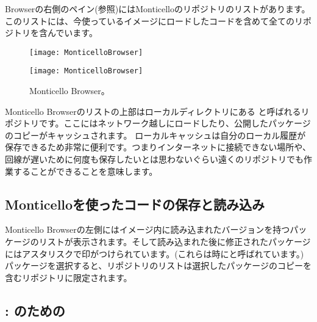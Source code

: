 \documentclass[a4paper,10pt,twoside]{book}
\begin{document}
Browserの右側のペイン(参照)にはMonticelloのリポジトリのリストがあります。このリストには、今使っているイメージにロードしたコードを含めて全てのリポジトリを含んでいます。


\begin{figure}[hbt]
\ifluluelse
	{\centerline {\texttt{[image: MonticelloBrowser]}}}
	{\centerline {\texttt{[image: MonticelloBrowser]}}}
\caption{Monticello Browser。
}
\end{figure}

Monticello Browserのリストの上部はローカルディレクトリにある と呼ばれるリポジトリです。ここにはネットワーク越しにロードしたり、公開したパッケージのコピーがキャッシュされます。
ローカルキャッシュは自分のローカル履歴が保存できるため非常に便利です。つまりインターネットに接続できない場所や、回線が遅いために何度も保存したいとは思わないぐらい遠くのリポジトリでも作業することができることを意味します。


\subsection{Monticelloを使ったコードの保存と読み込み}
Monticello Browserの左側にはイメージ内に読み込まれたバージョンを持つパッケージのリストが表示されます。そして読み込まれた後に修正されたパッケージにはアスタリスクで印がつけられています。(これらは時にと呼ばれています。) パッケージを選択すると、リポジトリのリストは選択したパッケージのコピーを含むリポジトリに限定されます。



\subsection{\ind{\sqsrc}: \pharo のための}
\end{document}
